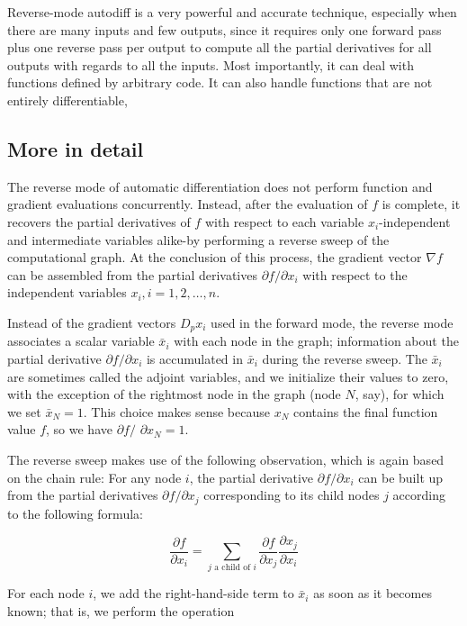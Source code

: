Reverse-mode autodiff is a very powerful and accurate technique, especially when there are many inputs and few outputs, since it requires only one forward pass plus one reverse pass per output to compute all the partial derivatives for all outputs with regards to all the inputs. Most importantly, it can deal with functions defined by arbitrary code. It can also handle functions that are not entirely differentiable,


\subsection*{More in detail}

The reverse mode of automatic differentiation does not perform function and gradient evaluations concurrently. Instead, after the evaluation of $f$ is complete, it recovers the partial
derivatives of $f$ with respect to each variable $x_{i}$-independent and intermediate variables alike-by performing a reverse sweep of the computational graph. At the conclusion of this process, the gradient vector $\nabla f$ can be assembled from the partial derivatives $\partial f / \partial x_{i}$ with respect to the independent variables $x_{i}, i=1,2, \ldots, n$.

Instead of the gradient vectors $D_{p} x_{i}$ used in the forward mode, the reverse mode associates a scalar variable $\bar{x}_{i}$ with each node in the graph; information about the partial derivative $\partial f / \partial x_{i}$ is accumulated in $\bar{x}_{i}$ during the reverse sweep. The $\bar{x}_{i}$ are sometimes called the adjoint variables, and we initialize their values to zero, with the exception of the rightmost node in the graph (node $N$, say), for which we set $\bar{x}_{N}=1$. This choice makes sense because $x_{N}$ contains the final function value $f$, so we have $\partial f /$ $\partial x_{N}=1$.

The reverse sweep makes use of the following observation, which is again based on the chain rule: For any node $i$, the partial derivative $\partial f / \partial x_{i}$ can be built up from the partial derivatives $\partial f / \partial x_{j}$ corresponding to its child nodes $j$ according to the following formula:

$$
\frac{\partial f}{\partial x_{i}}=\sum_{j \text { a child of } i} \frac{\partial f}{\partial x_{j}} \frac{\partial x_{j}}{\partial x_{i}}
$$

For each node $i$, we add the right-hand-side term to $\bar{x}_{i}$ as soon as it becomes known; that is, we perform the operation

